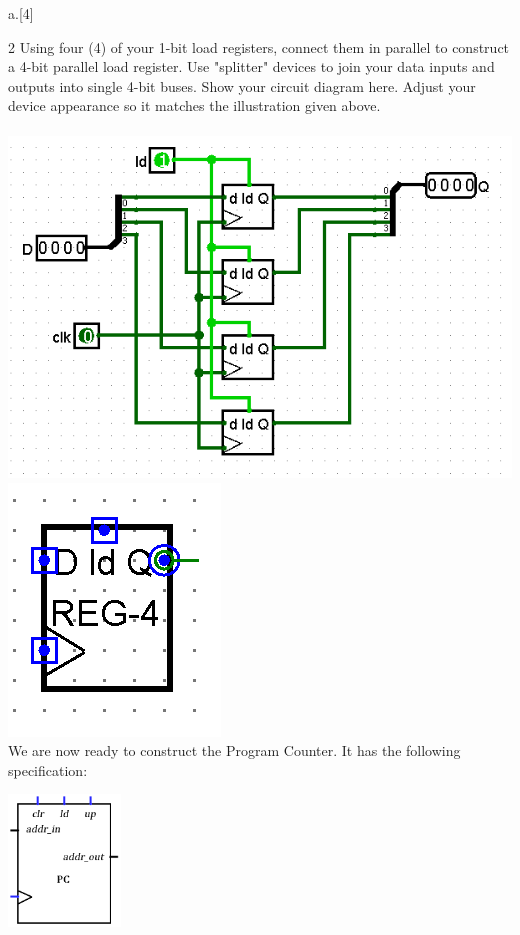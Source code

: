 \begin{question}{a.}[4]
\item[2] Using four (4) of your 1-bit load registers, connect them in parallel to construct a 4-bit parallel load register. Use "splitter" devices to join your data inputs and outputs into single 4-bit buses. Show your circuit diagram here. Adjust your device appearance so it matches the illustration given above.
\\
\\\includegraphics{q6-3-1.PNG}
\\\includegraphics{q6-3-2.PNG}
\\
We are now ready to construct the Program Counter. It has the following specification:

\includegraphics[height=3.5cm]{images/PC.png}


\end{question}

